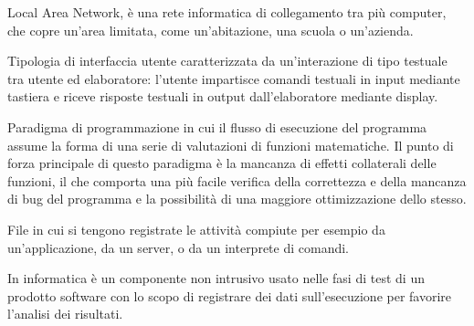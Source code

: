 
\begin{itemize}


Local Area Network, è una rete informatica di collegamento tra più computer, che copre un'area limitata, come un'abitazione, una scuola o un'azienda.


Tipologia di interfaccia utente caratterizzata da un'interazione di tipo testuale tra utente ed elaboratore: l'utente impartisce comandi testuali in input mediante tastiera e riceve risposte testuali in output dall'elaboratore mediante display.


Paradigma di programmazione in cui il flusso di esecuzione del programma assume la forma di una serie di valutazioni di funzioni matematiche. Il punto di forza principale di questo paradigma è la mancanza di effetti collaterali delle funzioni, il che comporta una più facile verifica della correttezza e della mancanza di bug del programma e la possibilità di una maggiore ottimizzazione dello stesso.





File in cui si tengono registrate le attività compiute per esempio da un'applicazione, da un server, o da un interprete di comandi.


In informatica è un componente non intrusivo usato nelle fasi di test di un prodotto software con lo scopo di registrare dei dati sull'esecuzione per favorire l'analisi dei risultati.

\end{itemize}


